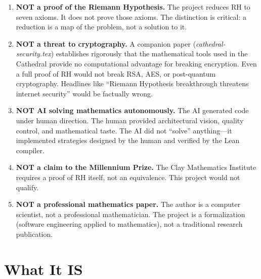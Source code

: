 \documentclass[11pt,a4paper]{article}
\begin{document}
\begin{enumerate}
  \item \textcolor{wrong}{\textbf{NOT a proof of the Riemann
    Hypothesis.}} The project reduces RH to seven axioms. It does
    not prove those axioms. The distinction is critical: a
    reduction is a map of the problem, not a solution to it.

  \item \textcolor{wrong}{\textbf{NOT a threat to cryptography.}}
    A companion paper (\emph{cathedral-security.tex}) establishes
    rigorously that the mathematical tools used in the Cathedral
    provide no computational advantage for breaking encryption.
    Even a full proof of RH would not break RSA, AES, or
    post-quantum cryptography. Headlines like ``Riemann Hypothesis
    breakthrough threatens internet security'' would be factually
    wrong.

  \item \textcolor{wrong}{\textbf{NOT AI solving mathematics
    autonomously.}} The AI generated code under human direction.
    The human provided architectural vision, quality control, and
    mathematical taste. The AI did not ``solve'' anything---it
    implemented strategies designed by the human and verified by
    the Lean compiler.

  \item \textcolor{wrong}{\textbf{NOT a claim to the Millennium
    Prize.}} The Clay Mathematics Institute requires a proof of
    RH itself, not an equivalence. This project would not qualify.

  \item \textcolor{wrong}{\textbf{NOT a professional mathematics
    paper.}} The author is a computer scientist, not a
    professional mathematician. The project is a formalization
    (software engineering applied to mathematics), not a
    traditional research publication.
\end{enumerate}

\section{What It IS}
\end{document}
